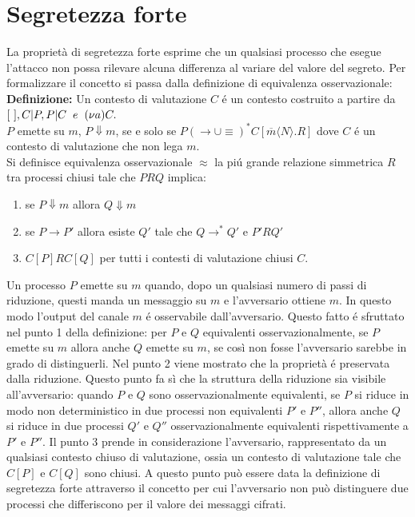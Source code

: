 \documentclass[12pt]{article}
\begin{document}
\section*{Segretezza forte}
La proprietà di segretezza forte esprime che un qualsiasi processo che esegue l'attacco non possa rilevare alcuna differenza al variare del valore del segreto.
Per formalizzare il concetto si passa dalla definizione di equivalenza osservazionale:\\

\textbf{Definizione:}  Un contesto di valutazione $C$ é un contesto costruito a partire da $[\ ], C | P, P|C \hspace{2mm}e\hspace{2mm} (\nu a)C.$\\
$P$ emette su $m$, $P \Downarrow m$, se e solo se $P (\rightarrow \cup \equiv)^* C[\overline{m}\langle N \rangle.R]$ dove $C$ é un contesto di valutazione che non lega $m$.\\

Si definisce equivalenza osservazionale $\approx$ la piú grande relazione simmetrica $R$ tra processi chiusi tale che $PRQ$ implica:\\
\begin{enumerate}
    \item se $P \Downarrow m$ allora $Q \Downarrow m$
    \item se $P \rightarrow P'$ allora esiste $Q'$ tale che $Q \rightarrow^* Q'$ e $P'RQ'$
    \item $C[P]RC[Q]$ per tutti i contesti di valutazione chiusi $C$.
\end{enumerate}
Un processo $P$ emette su $m$ quando, dopo un qualsiasi numero di passi di riduzione, questi manda un messaggio su $m$ e l'avversario ottiene $m$. In questo modo l'output del canale $m$ é osservabile dall'avversario. Questo fatto é sfruttato nel punto 1 della definizione: per $P$ e $Q$ equivalenti osservazionalmente, se $P$ emette su $m$ allora anche $Q$ emette su $m$, se così non fosse l'avversario sarebbe in grado di distinguerli. Nel punto 2 viene mostrato che la proprietà é preservata dalla riduzione. Questo punto fa sì che la struttura della riduzione sia visibile all'avversario: quando $P$ e $Q$ sono osservazionalmente equivalenti, se $P$ si riduce in modo non deterministico in due processi non equivalenti $P'$ e $P''$, allora anche $Q$ si riduce in due processi $Q'$ e $Q''$ osservazionalmente equivalenti rispettivamente a $P'$ e $P''$. Il punto 3 prende in considerazione l'avversario, rappresentato da un qualsiasi contesto chiuso di valutazione, ossia un contesto di valutazione tale che $C[P]$ e $C[Q]$ sono chiusi. A questo punto può essere data la definizione di segretezza forte attraverso il concetto per cui l'avversario non può distinguere due processi che differiscono per il valore dei messaggi cifrati.\\
\end{document}
